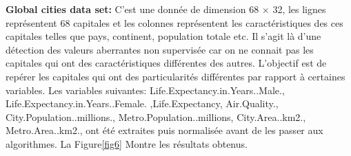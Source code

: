 \newpage
\textbf{Global cities data set:} 
 C’est une donnée de dimension 68 $\times$ 32, les lignes représentent  68 capitales  et les colonnes représentent les caractéristiques  des ces capitales telles que pays, continent, population totale etc.   Il s’agit là d’une détection des valeurs aberrantes non supervisée car on ne connait pas les capitales qui ont des caractéristiques différentes des autres. L’objectif est de repérer les capitales qui ont des particularités différentes par rapport à certaines variables. Les variables suivantes:  Life.Expectancy.in.Years..Male., Life.Expectancy.in.Years..Female. ,Life.Expectancy, Air.Quality., City.Population..millions., Metro.Population..millions, City.Area..km2., Metro.Area..km2., ont été extraites puis normalisée avant de les passer aux algorithmes. La Figure\ref{fig6} Montre les résultats obtenus.







\afterpage{\FloatBarrier}